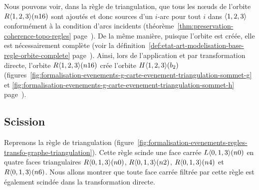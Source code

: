 Nous pouvons voir, dans la règle de triangulation, que tous les n\oe uds de
l'orbite $R\langle1,2,3\rangle(\allowbreak{}n16)$ sont ajoutés et donc sources d'un $i$-arc pour
tout $i$ dans $\langle1,2,3\rangle$ conformément à la condition d'arcs incidents
(théorème~\ref{thm:preservation-coherence-topo-regles}
page~\pageref{thm:preservation-coherence-topo-regles}). %
De la même manière, puisque l'orbite est créée, elle est nécessairement complète
(voir la définition~\ref{def:etat-art-modelisation-base-regle-orbite-complete}
page~\pageref{def:etat-art-modelisation-base-regle-orbite-complete}). %
Ainsi, lors de l'application et par transformation directe, l'orbite
$R\langle1,2,3\rangle(n16)$ crée l'orbite $H\langle1,2,3\rangle(b_{2})$
(figures~\ref{fig:formalisation-evenements-g-carte-evenement-triangulation-sommet-g}
et \ref{fig:formalisation-evenements-g-carte-evenement-triangulation-sommet-h}
page~\pageref{fig:formalisation-evenements-g-carte-evenement-triangulation-sommet-g}). %

\subsection{Scission}
\label{sec:formalisation-evenements-regles-transfo-graphe-scission}


Reprenons la règle de triangulation
(figure~\ref{fig:formalisation-evenements-regles-transfo-graphe-triangulation}). %
Cette règle scinde une face carrée $L\langle0,1,3\rangle(\allowbreak{}n0)$ en quatre faces
triangulaires $R\langle0,1,3\rangle(n0)$, $R\langle0,1,3\rangle(n2)$, $R\langle0,1,3\rangle(n4)$
et $R\langle0,1,3\rangle(n6)$. %
Nous allons montrer que toute face carrée filtrée par cette règle est également
scindée dans la transformation directe. %

